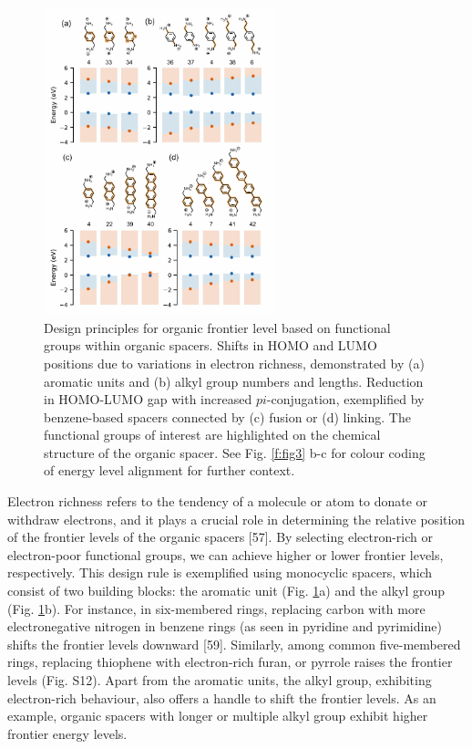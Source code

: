 \begin{figure}[!ht]
\centering
\includegraphics[width=0.6\textwidth]{figures/high-throughput-calculation/figure4.pdf}
\caption[Design principles for organic frontier level based on functional groups within organic spacers.]{Design principles for organic frontier level based on functional groups within organic spacers. Shifts in HOMO and LUMO positions due to variations in electron richness, demonstrated by (a) aromatic units and (b) alkyl group numbers and lengths. Reduction in HOMO-LUMO gap with increased $pi$-conjugation, exemplified by benzene-based spacers connected by (c) fusion or (d) linking. The functional groups of interest are highlighted on the chemical structure of the organic spacer. See Fig. \ref{f:fig3} b-c for colour coding of energy level alignment for further context.}
\label{f:fig4}
\end{figure}

Electron richness refers to the tendency of a molecule or atom to donate or withdraw electrons, and it plays a crucial role in determining the relative position of the frontier levels of the organic spacers [57]. By selecting electron-rich or electron-poor functional groups, we can achieve higher or lower frontier levels, respectively. This design rule is exemplified using monocyclic spacers, which consist of two building blocks: the aromatic unit (Fig. \ref{f:fig4}a) and the alkyl group (Fig. \ref{f:fig4}b). For instance, in six-membered rings, replacing carbon with more electronegative nitrogen in benzene rings (as seen in pyridine and pyrimidine) shifts the frontier levels downward [59]. Similarly, among common five-membered rings, replacing thiophene with electron-rich furan, or pyrrole raises the frontier levels (Fig. S12). Apart from the aromatic units, the alkyl group, exhibiting electron-rich behaviour, also offers a handle to shift the frontier levels. As an example, organic spacers with longer or multiple alkyl group exhibit higher frontier energy levels. 

